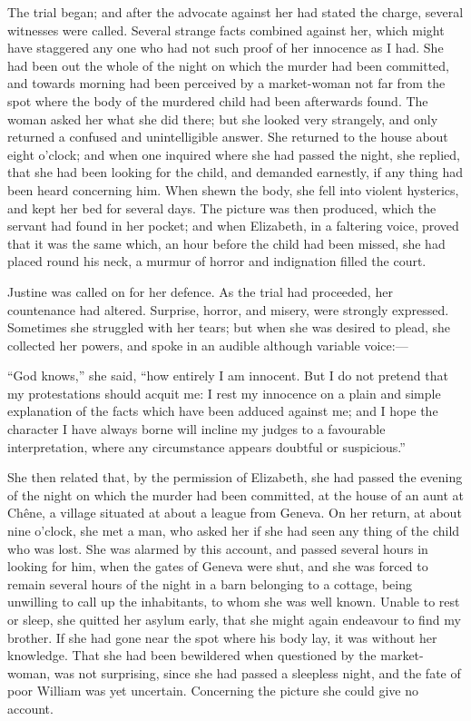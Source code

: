 The trial began; and after the advocate
against her had stated the charge,
several witnesses were called. Several
strange facts combined against her,
which might have staggered any one
who had not such proof of her innocence
as I had. She had been out the
whole of the night on which the murder
had been committed, and towards
morning had been perceived by a market-woman
not far from the spot where
the body of the murdered child had
been afterwards found. The woman
asked her what she did there; but she
looked very strangely, and only returned
a confused and unintelligible answer.
She returned to the house about
eight o'clock; and when one inquired
where she had passed the night, she replied,
that she had been looking for
the child, and demanded earnestly, if
any thing had been heard concerning
him. When shewn the body, she fell
into violent hysterics, and kept her bed
for several days. The picture was then
produced, which the servant had found
in her pocket; and when Elizabeth, in
a faltering voice, proved that it was the
same which, an hour before the child
had been missed, she had placed round
his neck, a murmur of horror and indignation
filled the court.

Justine was called on for her defence.
As the trial had proceeded, her countenance
had altered. Surprise, horror,
and misery, were strongly expressed.
Sometimes she struggled with her tears;
but when she was desired to plead, she
collected her powers, and spoke in an
audible although variable voice:---

``God knows,'' she said, ``how entirely
I am innocent. But I do not
pretend that my protestations should
acquit me: I rest my innocence on a
plain and simple explanation of the
facts which have been adduced against
me; and I hope the character I have
always borne will incline my judges
to a favourable interpretation, where
any circumstance appears doubtful or
suspicious.''

She then related that, by the permission
of Elizabeth, she had passed the
evening of the night on which the murder
had been committed, at the house
of an aunt at Chêne, a village situated
at about a league from Geneva. On
her return, at about nine o'clock, she
met a man, who asked her if she had
seen any thing of the child who was
lost. She was alarmed by this account,
and passed several hours in looking for
him, when the gates of Geneva were
shut, and she was forced to remain several
hours of the night in a barn belonging
to a cottage, being unwilling
to call up the inhabitants, to whom she
was well known. Unable to rest or
sleep, she quitted her asylum early, that
she might again endeavour to find my
brother. If she had gone near the spot
where his body lay, it was without her
knowledge. That she had been bewildered
when questioned by the market-woman,
was not surprising, since she
had passed a sleepless night, and the
fate of poor William was yet uncertain.
Concerning the picture she could give
no account.

